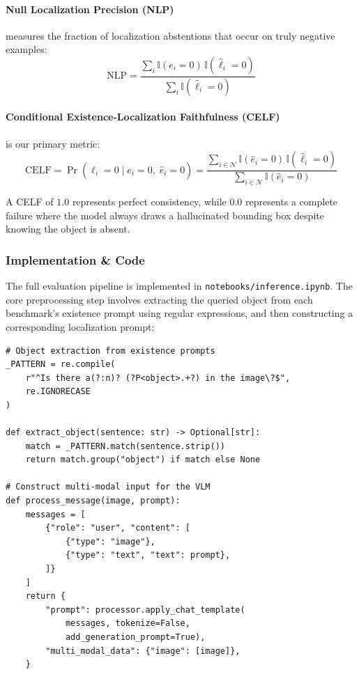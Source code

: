 \documentclass[12pt,a4paper]{article}
\begin{document}
\paragraph{Null Localization Precision (NLP)} measures the fraction of localization abstentions that occur on truly negative examples:
\begin{equation}
\text{NLP} = \frac{\sum_{i} \mathbb{I}(e_i = 0)\,\mathbb{I}(\hat{\ell}_i = 0)}{\sum_{i} \mathbb{I}(\hat{\ell}_i = 0)}
\end{equation}

\paragraph{Conditional Existence-Localization Faithfulness (CELF)} is our primary metric:
\begin{equation}
\text{CELF} = \Pr(\hat{\ell}_i = 0 \mid e_i = 0,\; \hat{e}_i = 0) = \frac{\sum_{i \in \mathcal{N}} \mathbb{I}(\hat{e}_i = 0)\,\mathbb{I}(\hat{\ell}_i = 0)}{\sum_{i \in \mathcal{N}} \mathbb{I}(\hat{e}_i = 0)}
\end{equation}

A CELF of $1.0$ represents perfect consistency, while $0.0$ represents a complete failure where the model always draws a hallucinated bounding box despite knowing the object is absent.

\subsubsection{Implementation \& Code}
The full evaluation pipeline is implemented in \texttt{notebooks/inference.ipynb}. The core preprocessing step involves extracting the queried object from each benchmark's existence prompt using regular expressions, and then constructing a corresponding localization prompt:

\begin{lstlisting}[caption={Object extraction and multi-modal message construction (\texttt{inference.ipynb})}]
# Object extraction from existence prompts
_PATTERN = re.compile(
    r"^Is there a(?:n)? (?P<object>.+?) in the image\?$",
    re.IGNORECASE
)

def extract_object(sentence: str) -> Optional[str]:
    match = _PATTERN.match(sentence.strip())
    return match.group("object") if match else None

# Construct multi-modal input for the VLM
def process_message(image, prompt):
    messages = [
        {"role": "user", "content": [
            {"type": "image"},
            {"type": "text", "text": prompt},
        ]}
    ]
    return {
        "prompt": processor.apply_chat_template(
            messages, tokenize=False,
            add_generation_prompt=True),
        "multi_modal_data": {"image": [image]},
    }
\end{lstlisting}
\end{document}
